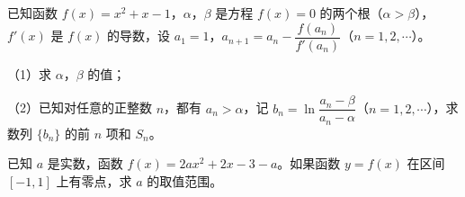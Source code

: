 \begin{question}
已知函数 $f(x)=x^2+x-1$，$\alpha$，$\beta$ 是方程 $f(x)=0$ 的两个根（$\alpha>\beta$），$f'(x)$ 是 $f(x)$ 的导数，设 $a_1=1$，$a_{n+1}=a_n-\dfrac{f(a_n)}{f'(a_n)}$（$n=1,2,\cdots$）。

（1）求 $\alpha$，$\beta$ 的值；

（2）已知对任意的正整数 $n$，都有 $a_n>\alpha$，记 $b_n=\ln\dfrac{a_n-\beta}{a_n-\alpha}$（$n=1,2,\cdots$），求数列 $\{b_n\}$ 的前 $n$ 项和 $S_n$。

\end{question}
\begin{question}
已知 $a$ 是实数，函数 $f(x)=2ax^2+2x-3-a$。如果函数 $y=f(x)$ 在区间 $[-1,1]$ 上有零点，求 $a$ 的取值范围。

\end{question}